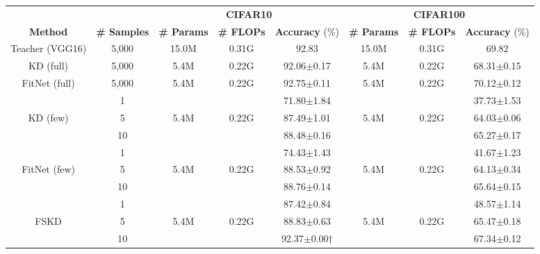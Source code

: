 \documentclass[letterpaper]{article} %
\begin{document}
{{
    \begin{table}[ht]
    \centering
    \begin{threeparttable}
    {
        \begin{tabular}{c|c|ccc|ccc}
        \hline
        \multicolumn{1}{c|}{} & \multicolumn{1}{c|}{}    & \multicolumn{3}{c|}{\textbf{CIFAR10}}  & \multicolumn{3}{c}{\textbf{CIFAR100}}\\
        \textbf{Method} & \textbf{\# Samples} & \textbf{\# Params} & \textbf{\# FLOPs} & \textbf{Accuracy} (\%) & \textbf{\# Params} & \textbf{\# FLOPs} & \textbf{Accuracy} (\%)\\ 
        \hline
        Teacher (VGG16) 
                & 5,000 & 15.0M   & 0.31G   & 92.83                   & 15.0M   & 0.31G   & 69.82 \\
        KD (full)
                & 5,000 & 5.4M    & 0.22G   & 92.06$\pm$0.17          & 5.4M    & 0.22G   & 68.31$\pm$0.15\\
        FitNet (full)
                & 5,000 & 5.4M    & 0.22G   & 92.75$\pm$0.11          & 5.4M    & 0.22G   & 70.12$\pm$0.12\\
        \hline
                & 1     &         &         & 71.80$\pm$1.84          &         &         & 37.73$\pm$1.53 \\
        KD (few)
                & 5     & 5.4M    & 0.22G   & 87.49$\pm$1.01          & 5.4M    & 0.22G   & 64.03$\pm$0.06 \\
                & 10    &         &         & 88.48$\pm$0.16          &         &         & 65.27$\pm$0.17 \\
        \hline
                & 1     &         &         & 74.43$\pm$1.43          &         &         & 41.67$\pm$1.23 \\
        FitNet (few)
                & 5     & 5.4M    & 0.22G   & 88.53$\pm$0.92          & 5.4M    & 0.22G   & 64.13$\pm$0.34 \\
                & 10    &         &         & 88.76$\pm$0.14          &         &         & 65.64$\pm$0.15 \\
        \hline
                & 1     &         &         & 87.42$\pm$0.84          &         &         & 48.57$\pm$1.14 \\
        FSKD
                & 5     & 5.4M    & 0.22G   & 88.83$\pm$0.63          & 5.4M    & 0.22G   & 65.47$\pm$0.18 \\
                & 10    &         &         & 92.37$\pm$0.00$\dag$    &         &         & 67.34$\pm$0.12 \\

\end{tabular}}
\end{threeparttable}
\end{table}}}
\end{document}
